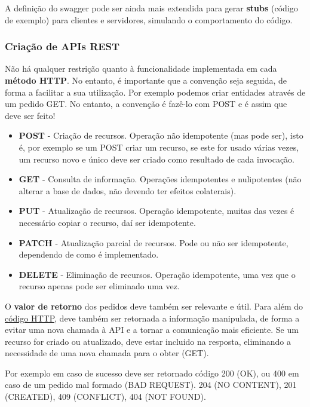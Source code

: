 \documentclass{article}
\begin{document}
A definição do swagger pode ser ainda mais extendida para gerar
\textbf{stubs} (código de exemplo) para clientes e servidores, simulando
o comportamento do código.

\subsubsection{Criação de APIs REST}

Não há qualquer restrição quanto à funcionalidade implementada em cada \textbf{método HTTP}. No
entanto, é importante que a convenção seja seguida, de forma a facilitar a sua utilização.
Por exemplo podemos criar entidades através de um pedido GET. No entanto, a convenção é fazê-lo com POST e é
assim que deve ser feito!

\begin{itemize}
  \item \textbf{POST} -  Criação de recursos. Operação não idempotente (mas pode ser),
  isto é, por exemplo se um POST criar um recurso, se este for usado várias vezes,
  um recurso novo e único deve ser criado como resultado de cada invocação.

  \item \textbf{GET} - Consulta de informação. Operações idempotentes e nulipotentes (não alterar a base de dados,
  não devendo ter efeitos colaterais).

  \item \textbf{PUT} -  Atualização de recursos. Operação idempotente,
  muitas das vezes é necessário copiar o recurso, daí ser idempotente.

  \pagebreak

  \item \textbf{PATCH} - Atualização parcial de recursos. Pode ou não ser idempotente,
  dependendo de como é implementado.

  \item \textbf{DELETE} - Eliminação de recursos. Operação idempotente,
  uma vez que o recurso apenas pode ser eliminado uma vez.
\end{itemize}

O \textbf{valor de retorno} dos pedidos deve também ser relevante e útil. Para além do \uline{código HTTP},
deve também ser retornada a informação manipulada, de forma a evitar uma nova chamada à
API e a tornar a comunicação mais eficiente. Se um recurso for
criado ou atualizado, deve estar incluido na resposta, eliminando a necessidade
de uma nova chamada para o obter (GET).

Por exemplo em caso de sucesso deve ser retornado código 200 (OK), ou 400 em caso de um pedido mal formado (BAD
REQUEST). 204 (NO CONTENT), 201 (CREATED), 409 (CONFLICT), 404 (NOT FOUND).
\end{document}

